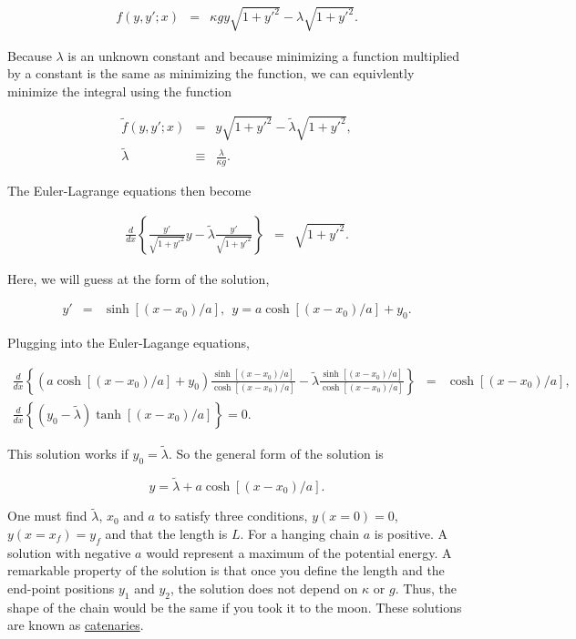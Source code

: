 \documentclass[%
oneside,                 %
final,                   %
10pt]{article}
\begin{document}
\begin{eqnarray}
f(y,y';x)&=&\kappa gy\sqrt{1+y'^2}-\lambda\sqrt{1+y'^2}.
\end{eqnarray}

Because $\lambda$ is an unknown constant and because minimizing a
function multiplied by a constant is the same as minimizing the
function, we can equivlently minimize the integral using the function

\begin{eqnarray}
\tilde{f}(y,y';x)&=&y\sqrt{1+y'^2}-\tilde{\lambda}\sqrt{1+y'^2},\\
\nonumber
\tilde{\lambda}&\equiv&\frac{\lambda}{\kappa g}.
\end{eqnarray}

The Euler-Lagrange equations then become

\begin{eqnarray*}
\frac{d}{dx}\left\{
\frac{y'}{\sqrt{1+y'^2}}y-\tilde{\lambda}\frac{y'}{\sqrt{1+y'^2}}
\right\}&=&\sqrt{1+y'^2}.
\end{eqnarray*}

Here, we will guess at the form of the solution,

\begin{eqnarray*}
y'&=&\sinh[(x-x_0)/a],~~y=a\cosh[(x-x_0)/a]+y_0.
\end{eqnarray*}

Plugging into the Euler-Lagange equations,

\begin{eqnarray*}
\frac{d}{dx}\left\{(a\cosh[(x-x_0)/a]+y_0)\frac{\sinh[(x-x_0)/a]}{\cosh[(x-x_0)/a]}-\tilde{\lambda}\frac{\sinh[(x-x_0)/a]}{\cosh[(x-x_0)/a]}\right\}&=&\cosh[(x-x_0)/a],\\
\nonumber
\frac{d}{dx}\left\{(y_0-\tilde{\lambda})\tanh[(x-x_0)/a]\right\}=0.
\end{eqnarray*}

This solution works if $y_0=\tilde{\lambda}$. So the general form of
the solution is

\[
y=\tilde{\lambda}+a\cosh[(x-x_0)/a].
\]

One must find $\tilde{\lambda}$, $x_0$ and $a$ to satisfy three
conditions, $y(x=0)=0$, $y(x=x_f)=y_f$ and that the length is $L$. For
a hanging chain $a$ is positive. A solution with negative $a$ would
represent a maximum of the potential energy. A remarkable property of
the solution is that once you define the length and the end-point
positions $y_1$ and $y_2$, the solution does not depend on $\kappa$ or
$g$. Thus, the shape of the chain would be the same if you took it to
the moon. These solutions are known as \href{{http://en.wikipedia.org/wiki/Catenary}{http://en.wikipedia.org/wiki/Catenary}}{catenaries}.
\end{document}
